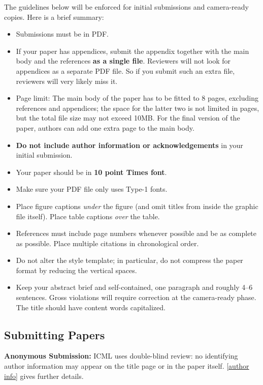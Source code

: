 \documentclass{article}
\theoremstyle{plain}
\theoremstyle{definition}
\theoremstyle{remark}
\begin{document}
The guidelines below will be enforced for initial submissions and
camera-ready copies. Here is a brief summary:
\begin{itemize}
\item Submissions must be in PDF\@. 
\item If your paper has appendices, submit the appendix together with the main body and the references \textbf{as a single file}. Reviewers will not look for appendices as a separate PDF file. So if you submit such an extra file, reviewers will very likely miss it.
\item Page limit: The main body of the paper has to be fitted to 8 pages, excluding references and appendices; the space for the latter two is not limited in pages, but the total file size may not exceed 10MB. For the final version of the paper, authors can add one extra page to the main body.
\item \textbf{Do not include author information or acknowledgements} in your
    initial submission.
\item Your paper should be in \textbf{10 point Times font}.
\item Make sure your PDF file only uses Type-1 fonts.
\item Place figure captions \emph{under} the figure (and omit titles from inside
    the graphic file itself). Place table captions \emph{over} the table.
\item References must include page numbers whenever possible and be as complete
    as possible. Place multiple citations in chronological order.
\item Do not alter the style template; in particular, do not compress the paper
    format by reducing the vertical spaces.
\item Keep your abstract brief and self-contained, one paragraph and roughly
    4--6 sentences. Gross violations will require correction at the
    camera-ready phase. The title should have content words capitalized.
\end{itemize}

\subsection{Submitting Papers}

\textbf{Anonymous Submission:} ICML uses double-blind review: no identifying
author information may appear on the title page or in the paper
itself. \cref{author info} gives further details.

\medskip
\end{document}
